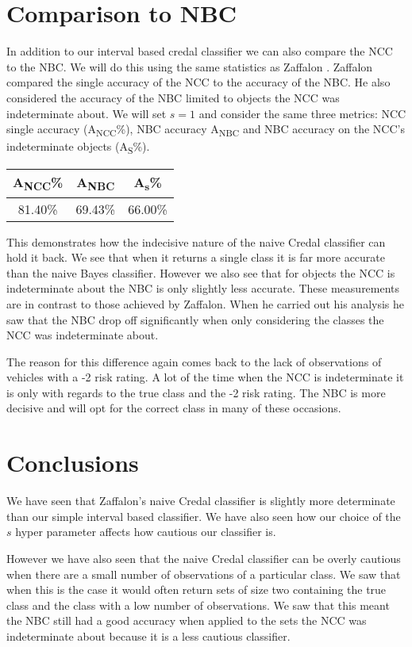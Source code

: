 \section{Comparison to NBC}

In addition to our interval based credal classifier we can also compare the NCC to the NBC.
We will do this using the same statistics as Zaffalon \cite{Zaffalon01}.
Zaffalon compared the single accuracy of the NCC to the accuracy of the NBC.
He also considered the accuracy of the NBC limited to objects the NCC was indeterminate about.
We will set $s=1$ and consider the same three metrics: NCC single accuracy (A\textsubscript{NCC}\%), NBC accuracy A\textsubscript{NBC} and NBC accuracy on  the NCC's indeterminate objects (A\textsubscript{S}\%).
\begin{center}
\begin{tabular}{c c c}
\hline
A\textsubscript{NCC}\% & A\textsubscript{NBC} & A\textsubscript{s}\% \\
\hline
81.40\%                & 69.43\%              & 66.00\% \\
\hline
\end{tabular}
\end{center}

This demonstrates how the indecisive nature of the naive Credal classifier can hold it back.
We see that when it returns a single class it is far more accurate than the naive Bayes classifier.
However we also see that for objects the NCC is indeterminate about the NBC is only slightly less accurate.
These measurements are in contrast to those achieved by Zaffalon.
When he carried out his analysis he saw that the NBC drop off significantly when only considering the classes the NCC was indeterminate about.

The reason for this difference again comes back to the lack of observations of vehicles with a -2 risk rating.
A lot of the time when the NCC is indeterminate it is only with regards to the true class and the -2 risk rating.
The NBC is more decisive and will opt for the correct class in many of these occasions.

\section{Conclusions}

We have seen that Zaffalon's naive Credal classifier is slightly more determinate than our simple interval based classifier.
We have also seen how our choice of the $s$ hyper parameter affects how cautious our classifier is.

However we have also seen that the naive Credal classifier can be overly cautious when there are a small number of observations of a particular class.
We saw that when this is the case it would often return sets of size two containing the true class and the class with a low number of observations.
We saw that this meant the NBC still had a good accuracy when applied to the sets the NCC was indeterminate about because it is a less cautious classifier.